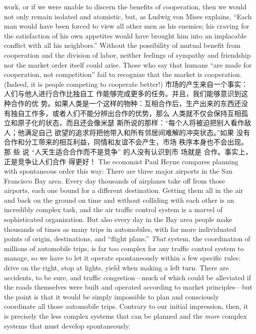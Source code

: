 \begin{paracol}{2}
work, or if we were unable to discern the benefits of cooperation, then we would not only remain isolated and atomistic, but, as Ludwig von Mises explains, ``Each man would have been
forced to view all other men as his enemies; his craving for the
satisfaction of his own appetites would have brought him into
an implacable conflict with all his neighbors.'' Without the possibility of mutual benefit from cooperation and the division of
labor, neither feelings of sympathy and friendship nor the market order itself could arise. Those who say that humans ``are
made for cooperation, not competition'' fail to recognize that
the market is cooperation. (Indeed, it is people competing to
cooperate better!)
\switchcolumn
市场的产生来自一个事实：人们与他人进行合作比独自工
作能够完成更多的任务。并且，我们能够意识到这种合作的优
势。如果人类是一个这样的物种：互相合作后，生产出来的东西还没有独自工作多，或者人们不能分辨出合作的优势，那么
人类就不仅会保持互相孤立和原子化的状态，而且还会像米瑟
斯所说的那样：“每个人将被迫把别人看作敌人；他满足自己
欲望的追求将把他带入和所有邻居间难解的冲突状态。”如果
没有合作和分工带来的相互利益，同情和友谊不会产生，市场
秩序本身也不会出现。那 些 说 “人天生适合合作而不是竞争”
的人没有认识到市 场就是 合作。事实上，正是竞争让人们合作
得更好！
\switchcolumn*
The economist Paul Heyne compares planning with spontaneous order this way: There are three major airports in the San
Francisco Bay area. Every day thousands of airplanes take off
from those airports, each one bound for a different destination.
Getting them all in the air and back on the ground on time and
without colliding with each other is an incredibly complex task,
and the air traffic control system is a marvel of sophisticated organization. But also every day in the Bay area people make
thousands of times as many trips in automobiles, with far more
individuated points of origin, destinations, and ``flight plans.''
\textit{That} system, the coordination of millions of automobile trips, is
far too complex for any traffic control system to manage, so we
have to let it operate spontaneously within a few specific rules:
drive on the right, stop at lights, yield when making a left turn.
There are accidents, to be sure, and traffic congestion---much
of which could be alleviated if the roads themselves were built
and operated according to market principles---but the point is
that it would be simply impossible to plan and consciously coordinate all those automobile trips. Contrary to our initial impression, then, it is precisely the less complex systems that can be
planned and the \textit{more} complex systems that must develop spontaneously.

\end{paracol}

